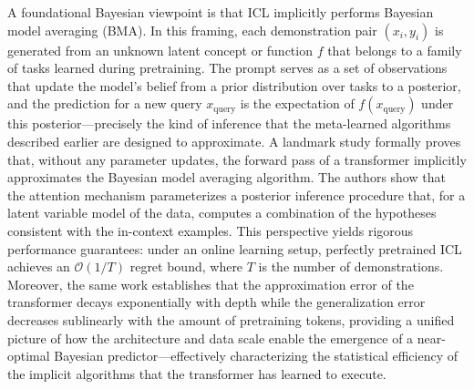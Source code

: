 \documentclass[11pt]{article}
\begin{document}
A foundational Bayesian viewpoint is that ICL implicitly performs Bayesian model averaging (BMA). In this framing, each demonstration pair \((x_i, y_i)\) is generated from an unknown latent concept or function \(f\) that belongs to a family of tasks learned during pretraining. The prompt serves as a set of observations that update the model's belief from a prior distribution over tasks to a posterior, and the prediction for a new query \(x_{\text{query}}\) is the expectation of \(f(x_{\text{query}})\) under this posterior---precisely the kind of inference that the meta-learned algorithms described earlier are designed to approximate. A landmark study \cite{ref10} formally proves that, without any parameter updates, the forward pass of a transformer implicitly approximates the Bayesian model averaging algorithm. The authors show that the attention mechanism parameterizes a posterior inference procedure that, for a latent variable model of the data, computes a combination of the hypotheses consistent with the in-context examples. This perspective yields rigorous performance guarantees: under an online learning setup, perfectly pretrained ICL achieves an \(\mathcal{O}(1/T)\) regret bound, where \(T\) is the number of demonstrations. Moreover, the same work establishes that the approximation error of the transformer decays exponentially with depth while the generalization error decreases sublinearly with the amount of pretraining tokens, providing a unified picture of how the architecture and data scale enable the emergence of a near-optimal Bayesian predictor---effectively characterizing the statistical efficiency of the implicit algorithms that the transformer has learned to execute.
\end{document}

